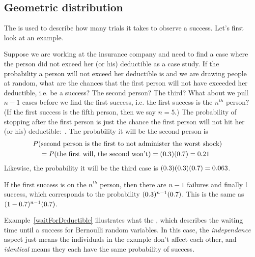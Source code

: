 
\subsection{Geometric distribution}


The 
is used to describe how
many trials it takes to observe a success.
Let's first look at an example.

\begin{examplewrap}
\begin{nexample}{Suppose we are working at the insurance
    company and need to find a case where the person did
    not exceed her (or his) deductible as a case study.
    If the probability a person will not exceed her
    deductible is \insureSprob{} and we are drawing people
    at random, what are the chances that the first person
    will not have exceeded her deductible, i.e. be a success?
    The second person?
    The third?
    What about we pull $n - 1$ cases before we find
    the first success, i.e. the first success is the
    $n^{th}$ person?
    (If the first success is the fifth person, then we say $n=5$.)}
  \label{waitForDeductible}%
  The probability of stopping after the first person is just
  the chance the first person will not hit her (or his)
  deductible:~\insureSprob{}.
  The probability it will be the second person is
  \begin{align*}
  &P(\text{second person is the first to not administer the
      worst shock}) \\
  &\quad
    = P(\text{the first will, the second won't})
    = (0.3{})(0.7{})
    = 0.21{}
  \end{align*}
  Likewise, the probability it will be the third case is
  $(0.3{})(0.3{})(0.7{})
    = 0.063$.

  If the first success is on the $n^{th}$ person,
  then there are $n-1$ failures and finally 1 success,
  which corresponds to the probability
  $(0.3{})^{n-1}(0.7{})$.
  This is the same as
  $(1-0.7{})^{n-1}(0.7{})$.
\end{nexample}
\end{examplewrap}

Example~\ref{waitForDeductible} illustrates what the
,
which describes the waiting
time until a success for
Bernoulli random variables.
In this case, the \emph{independence} aspect just means
the individuals in the example don't affect each other,
and \emph{identical} means they each have the same probability
of success.

